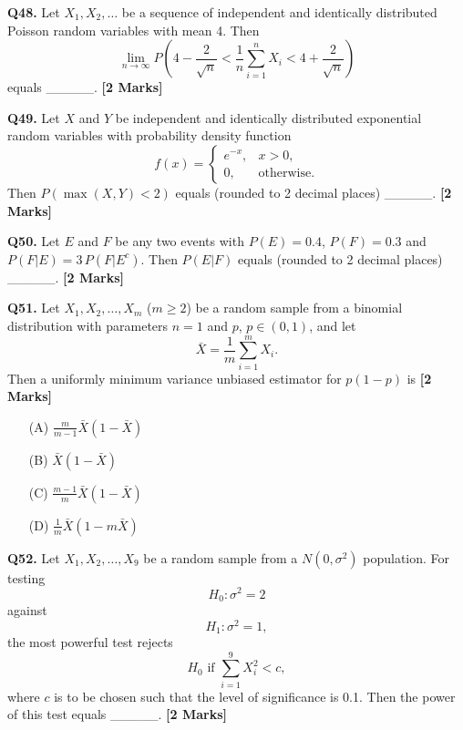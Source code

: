 \documentclass[11pt]{article}
\newcommand{\questionb}[2]{
    \noindent\textbf{Q#2.} #1 \hfill \textbf{[2 Marks]}
}
\begin{document}
\questionb{Let \( X_1, X_2, \ldots \) be a sequence of independent and identically distributed Poisson random variables with mean 4. Then  
\[\lim_{n \to \infty} P \left( 4 - \frac{2}{\sqrt{n}} < \frac{1}{n} \sum_{i=1}^n X_i < 4 + \frac{2}{\sqrt{n}} \right)\] equals \_\_\_\_\_.}{48}
\vspace{0.5cm}

\questionb{Let \( X \) and \( Y \) be independent and identically distributed exponential random variables with probability density function  
\[f(x) = 
\begin{cases} 
e^{-x}, & x > 0, \\
0, & \text{otherwise}. 
\end{cases}\]
Then \( P(\max(X, Y) < 2) \) equals (rounded to 2 decimal places) \_\_\_\_\_.}{49}
\vspace{0.5cm}

\questionb{Let \( E \) and \( F \) be any two events with \( P(E) = 0.4 \), \( P(F) = 0.3 \) and \( P(F | E) = 3 \, P(F | E^c) \). Then \( P(E | F) \) equals (rounded to 2 decimal places) \_\_\_\_\_.}{50}
\vspace{0.5cm}

\questionb{Let \( X_1, X_2, \ldots, X_m \) (\( m \geq 2 \)) be a random sample from a binomial distribution with parameters \( n = 1 \) and \( p \), \( p \in (0,1) \), and let  
\[\bar{X} = \frac{1}{m} \sum_{i=1}^{m} X_i.\]  
Then a uniformly minimum variance unbiased estimator for \( p(1-p) \) is}{51}
\begin{enumerate}
    \item[(A)] \(\frac{m}{m-1} \bar{X}(1-\bar{X})\)  
    \item[(B)] \(\bar{X}(1-\bar{X})\)  
    \item[(C)] \(\frac{m-1}{m} \bar{X}(1-\bar{X})\)  
    \item[(D)] \(\frac{1}{m} \bar{X}(1-m\bar{X})\)  
\end{enumerate}
\vspace{0.5cm}

\questionb{Let \( X_1, X_2, \ldots, X_9 \) be a random sample from a \( N(0, \sigma^2) \) population. For testing  
\[H_0: \sigma^2 = 2\]  
against  
\[H_1: \sigma^2 = 1,\]  
the most powerful test rejects  
\[H_0 \text{ if } \sum_{i=1}^9 X_i^2 < c,\]  
where \( c \) is to be chosen such that the level of significance is 0.1. Then the power of this test equals \_\_\_\_\_.}{52}
\vspace{0.5cm}
\end{document}
